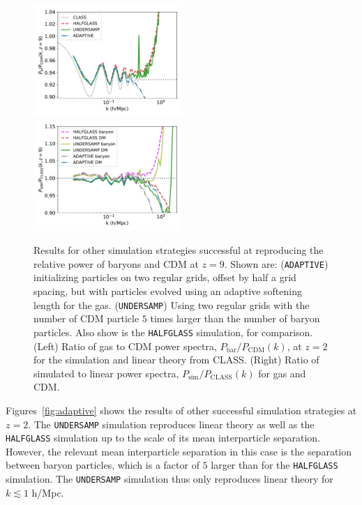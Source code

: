 \documentclass[a4paper,11pt]{article}
\begin{document}
\begin{figure}
\includegraphics[width=0.5\textwidth]{plots/oversample_9_relpower.pdf}
  \includegraphics[width=0.5\textwidth]{plots/oversample_9_class.pdf}
\caption{Results for other simulation strategies successful at reproducing the relative power of baryons and CDM at $z=9$. Shown are: (\texttt{ADAPTIVE}) initializing particles on two regular grids, offset by half a grid spacing, but with particles evolved using an adaptive softening length for the gas. (\texttt{UNDERSAMP}) Using two regular grids with the number of CDM particle $5$ times larger than the number of baryon particles. Also show is the \texttt{HALFGLASS} simulation, for comparison. (Left) Ratio of gas to CDM power spectra, $P_\mathrm{bar}/P_\mathrm{CDM}(k)$, at $z=2$ for the simulation and linear theory from CLASS. (Right) Ratio of simulated to linear power spectra, $P_\mathrm{sim}/P_\mathrm{CLASS}(k)$ for gas and CDM.}
  \label{fig:adaptivez9}
\end{figure}

Figures~\ref{fig:adaptive} shows the results of other successful simulation strategies at $z=2$. The \texttt{UNDERSAMP} simulation reproduces linear theory as well as the \texttt{HALFGLASS} simulation up to the scale of its mean interparticle separation. However, the relevant mean interparticle separation in this case is the separation between baryon particles, which is a factor of $5$ larger than for the \texttt{HALFGLASS} simulation. The \texttt{UNDERSAMP} simulation thus only reproduces linear theory for $k \lesssim 1$ h/Mpc.
\end{document}
